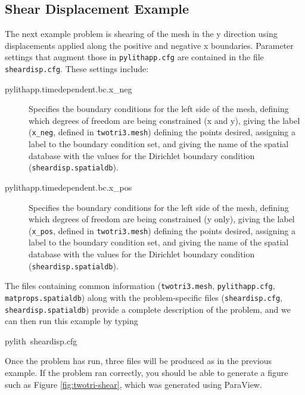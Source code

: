 \subsection{Shear Displacement Example}

The next example problem is shearing of the mesh in the y direction
using displacements applied along the positive and negative x boundaries.
Parameter settings that augment those in \texttt{pylithapp.cfg} are
contained in the file \texttt{sheardisp.cfg}. These settings include:
\begin{description}
\item [{pylithapp.timedependent.bc.x\_neg}] Specifies the boundary conditions
for the left side of the mesh, defining which degrees of freedom are
being constrained (x and y), giving the label (\texttt{x\_neg}, defined
in \texttt{twotri3.mesh}) defining the points desired, assigning a
label to the boundary condition set, and giving the name of the spatial
database with the values for the Dirichlet boundary condition (\texttt{sheardisp.spatialdb}).
\item [{pylithapp.timedependent.bc.x\_pos}] Specifies the boundary conditions
for the left side of the mesh, defining which degrees of freedom are
being constrained (y only), giving the label (\texttt{x\_pos}, defined
in \texttt{twotri3.mesh}) defining the points desired, assigning a
label to the boundary condition set, and giving the name of the spatial
database with the values for the Dirichlet boundary condition (\texttt{sheardisp.spatialdb}).
\end{description}
The files containing common information (\texttt{twotri3.mesh}, \texttt{pylithapp.cfg},
\texttt{matprops.spatialdb}) along with the problem-specific files
(\texttt{sheardisp.cfg}, \texttt{sheardisp.spatialdb}) provide a complete
description of the problem, and we can then run this example by typing
\begin{lyxcode}
pylith~sheardisp.cfg
\end{lyxcode}
Once the problem has run, three files will be produced as in the previous
example. If the problem ran correctly, you should be able to generate
a figure such as Figure \vref{fig:twotri-shear}, which was generated
using ParaView.

